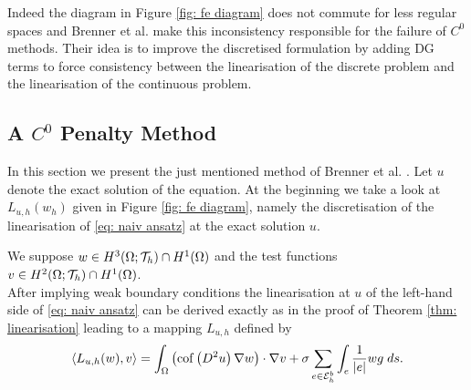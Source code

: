 Indeed the diagram in Figure \ref{fig: fe diagram} does not commute for less regular spaces and Brenner et al. make this inconsistency responsible for the failure of $C^0$ methods\cite{BGN+2011}. Their idea is to improve the discretised formulation by adding DG terms to force consistency between the linearisation of the discrete problem and the linearisation of the continuous problem.

\subsection{A $C^0$ Penalty Method }\label{sec: Brenner method}

In this section we present the just mentioned method of Brenner et al. \cite{BGN+2011}. Let $u$ denote the exact solution of the \MA equation. 
At the beginning we take a look at $L_{u,h}(w_h)$ given in Figure \ref{fig: fe diagram}, namely the discretisation of the linearisation of \eqref{eq: naiv ansatz} at the exact solution $u$.

 We suppose $w \in H^3(\Omega; \mathcal{T}_h) \cap H^1(\Omega)$ and the test functions $v \in H^2(\Omega; \mathcal{T}_h) \cap H^1(\Omega)$. 
\\
After implying weak boundary conditions the linearisation at $u$ of the left-hand side of \eqref{eq: naiv ansatz} can be derived exactly as in the proof of Theorem \ref{thm: linearisation} leading to a mapping $L_{u,h}$ defined by
\begin{align}
\langle L_{u,h}(w),v\rangle %
= \int_{\Omega} \left( \mycof {D^2 u } \nabla w \right) \cdot \nabla v + \sigma \sum_{e \in \edgesb} \myIntS {e} {\frac 1 {|e|}{w}{g}} . 
\label{eq: linearOperator}
\end{align}

